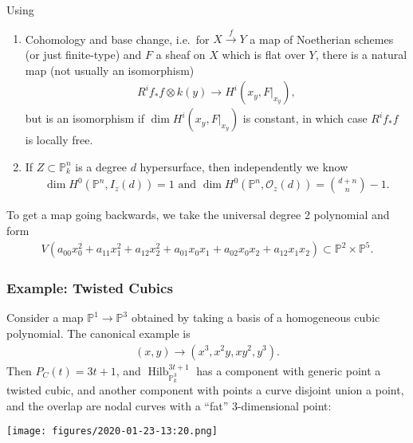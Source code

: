 Using

\begin{enumerate}
\def\labelenumi{\arabic{enumi}.}
\item
  Cohomology and base change, i.e.~for \(X \xrightarrow{f} Y\) a map of
  Noetherian schemes (or just finite-type) and \(F\) a sheaf on \(X\)
  which is flat over \(Y\), there is a natural map (not usually an
  isomorphism)
  \begin{align*}
  R^i f_* f \otimes k(y) \to H^i(x_y,  {\left.{{F}} \right|_{{x_y}} } )
  ,\end{align*}
  but is an isomorphism if
  \(\dim H^i(x_y, {\left.{{F}} \right|_{{x_y}} } )\) is constant, in
  which case \(R^i f_* f\) is locally free.
\item
  If \(Z \subset {\mathbb{P}}^n_k\) is a degree \(d\) hypersurface, then
  independently we know
  \begin{align*}
    \dim H^0({\mathbb{P}}^n, I_z(d)) = 1 \text{ and } \dim H^0({\mathbb{P}}^n, {\mathcal{O}}_z(d)) = {d+n \choose n} - 1
    .\end{align*}
\end{enumerate}

To get a map going backwards, we take the universal degree 2 polynomial
and form
\begin{align*}
V(a_{00} x_0^2 + a_{11} x_1^2 + a_{12}x_2^2 + a_{01}x_0 x_1 + a_{02} x_0 x_2 + a_{12} x_1 x_2) \subset {\mathbb{P}}^2 \times{\mathbb{P}}^5
.\end{align*}

\hypertarget{example-twisted-cubics}{%
\subsubsection{Example: Twisted Cubics}\label{example-twisted-cubics}}

Consider a map \({\mathbb{P}}^1 \to {\mathbb{P}}^3\) obtained by taking
a basis of a homogeneous cubic polynomial. The canonical example is
\begin{align*}
(x, y) \to (x^3, x^2y, xy^2, y^3)
.\end{align*}
Then \(P_C(t) = 3t + 1\), and
\(\operatorname{Hilb}_{{\mathbb{P}}_k^3}^{3t+1}\) has a component with
generic point a twisted cubic, and another component with points a curve
disjoint union a point, and the overlap are nodal curves with a ``fat''
3-dimensional point:

\texttt{[image: figures/2020-01-23-13:20.png]}\\

